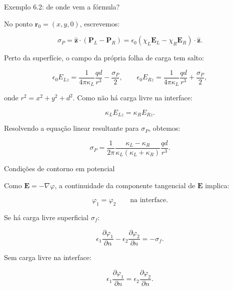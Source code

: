 \documentclass[aspectratio=169]{beamer}
\begin{document}
\begin{frame}{Exemplo 6.2: de onde vem a fórmula?}

\scriptsize

No ponto \(\mathbf r_0=(x,y,0)\), escrevemos:

\[
\sigma_P=\hat{\mathbf z}\cdot(\mathbf P_L-\mathbf P_R)
=
\epsilon_0(\chi_L\mathbf E_L-\chi_R\mathbf E_R)\cdot\hat{\mathbf z}.
\]

Perto da superfície, o campo da própria folha de carga tem salto:

\[
\epsilon_0 E_{Lz}
=
\frac{1}{4\pi\kappa_L}\frac{qd}{r^3}
-\frac{\sigma_P}{2},
\qquad
\epsilon_0 E_{Rz}
=
\frac{1}{4\pi\kappa_L}\frac{qd}{r^3}
+\frac{\sigma_P}{2},
\]

onde \(r^2=x^2+y^2+d^2\). Como não há carga livre na interface:

\[
\kappa_L E_{Lz}=\kappa_R E_{Rz}.
\]

Resolvendo a equação linear resultante para \(\sigma_P\), obtemos:

\begin{eqbox}
\[
\sigma_P
=
\frac{1}{2\pi}
\frac{\kappa_L-\kappa_R}{\kappa_L(\kappa_L+\kappa_R)}
\frac{qd}{r^3}.
\]
\end{eqbox}

\end{frame}

\begin{frame}{Condições de contorno em potencial}

\small

Como \(\mathbf E=-\nabla\varphi\), a continuidade da componente tangencial de
\(\mathbf E\) implica:

\begin{eqbox}
\begin{equation}
\varphi_1=\varphi_2
\qquad \text{na interface.}
\tag{6.70}
\label{eq:bc-potencial-continuo}
\end{equation}
\end{eqbox}

Se há carga livre superficial \(\sigma_f\):

\begin{eqbox}
\begin{equation}
\epsilon_1\frac{\partial\varphi_1}{\partial n}
-
\epsilon_2\frac{\partial\varphi_2}{\partial n}
=
-\sigma_f.
\tag{6.71}
\label{eq:bc-potencial-normal}
\end{equation}
\end{eqbox}

Sem carga livre na interface:

\begin{eqbox}
\begin{equation}
\epsilon_1\frac{\partial\varphi_1}{\partial n}
=
\epsilon_2\frac{\partial\varphi_2}{\partial n}.
\tag{6.73}
\end{equation}
\end{eqbox}

\end{frame}
\end{document}
